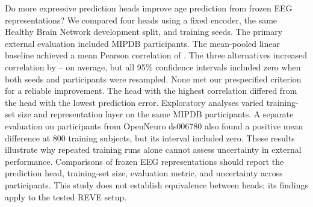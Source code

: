 Do more expressive prediction heads improve age prediction from frozen EEG
representations? We compared four heads using a fixed \REVE{} encoder, the same
Healthy Brain Network development split, and \ProbeSeeds{} training seeds. The
primary external evaluation included \PrimarySubjects{} MIPDB participants.
The mean-pooled linear baseline achieved a mean Pearson correlation of
\BaselinePearson{}. The three alternatives increased correlation by
\LayerLinearPearsonDelta{}--\RichResidualPearsonDelta{} on average, but all
95\% confidence intervals included zero when both seeds and participants were
resampled. None met our prespecified criterion for a reliable improvement.
The head with the highest correlation differed from the head with the lowest
prediction error. Exploratory analyses varied training-set size and
representation layer on the same MIPDB participants. A separate evaluation on
\DsSubjectCount{} participants from OpenNeuro ds006780 also found a positive
mean difference at 800 training subjects, but its interval included zero.
These results illustrate why repeated training runs alone cannot assess
uncertainty in external performance. Comparisons of frozen EEG representations
should report the prediction head, training-set size, evaluation metric, and
uncertainty across participants. This study does not establish equivalence
between heads; its findings apply to the tested REVE setup.
